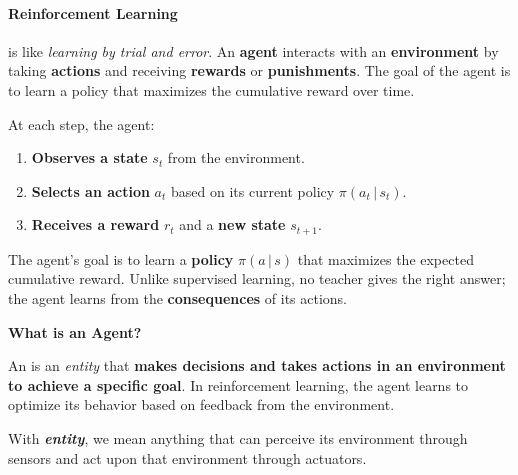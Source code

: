 \paragraph{Reinforcement Learning}

 is like \emph{learning by trial and error}. An \textbf{agent} interacts with an \textbf{environment} by taking \textbf{actions} and receiving \textbf{rewards} or \textbf{punishments}. The goal of the agent is to learn a policy that maximizes the cumulative reward over time.

\highspace
At each step, the agent:
\begin{enumerate}
    \item \textbf{Observes a state} $s_t$ from the environment.
    \item \textbf{Selects an action} $a_t$ based on its current policy $\pi\left(a_t \, | \, s_t\right)$.
    \item \textbf{Receives a reward} $r_t$ and a \textbf{new state} $s_{t+1}$.
\end{enumerate}
The agent's goal is to learn a \textbf{policy} $\pi\left(a \, | \, s\right)$ that maximizes the expected cumulative reward. Unlike supervised learning, no teacher gives the right answer; the agent learns from the \textbf{consequences} of its actions.

\highspace
\begin{flushleft}
    \textcolor{Green3}{ \textbf{What is an Agent?}}
\end{flushleft}
An  is an \emph{entity} that \textbf{makes decisions and takes actions in an environment to achieve a specific goal}. In reinforcement learning, the agent learns to optimize its behavior based on feedback from the environment.

\highspace
With \textbf{\emph{entity}}, we mean anything that can perceive its environment through sensors and act upon that environment through actuators.

